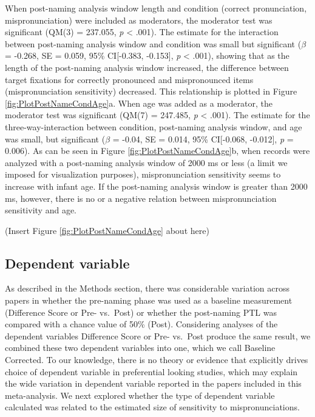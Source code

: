 \documentclass[
  man, noextraspace]{apa6}
\begin{document}
When post-naming analysis window length and condition (correct pronunciation, mispronunciation) were included as moderators, the moderator test was significant (QM(3) = 237.055, \emph{p} \textless{} .001). The estimate for the interaction between post-naming analysis window and condition was small but significant (\(\beta\) = -0.268, SE = 0.059, 95\% CI{[}-0.383, -0.153{]}, \emph{p} \textless{} .001), showing that as the length of the post-naming analysis window increased, the difference between target fixations for correctly pronounced and mispronounced items (mispronunciation sensitivity) decreased. This relationship is plotted in Figure \ref{fig:PlotPostNameCondAge}a. When age was added as a moderator, the moderator test was significant (QM(7) = 247.485, \emph{p} \textless{} .001). The estimate for the three-way-interaction between condition, post-naming analysis window, and age was small, but significant (\(\beta\) = -0.04, SE = 0.014, 95\% CI{[}-0.068, -0.012{]}, \emph{p} = 0.006). As can be seen in Figure \ref{fig:PlotPostNameCondAge}b, when records were analyzed with a post-naming analysis window of 2000 ms or less (a limit we imposed for visualization purposes), mispronunciation sensitivity seems to increase with infant age. If the post-naming analysis window is greater than 2000 ms, however, there is no or a negative relation between mispronunciation sensitivity and age.

(Insert Figure \ref{fig:PlotPostNameCondAge} about here)

\hypertarget{dependent-variable}{%
\subsection{Dependent variable}\label{dependent-variable}}

As described in the Methods section, there was considerable variation across papers in whether the pre-naming phase was used as a baseline measurement (Difference Score or Pre- vs.~Post) or whether the post-naming PTL was compared with a chance value of 50\% (Post). Considering analyses of the dependent variables Difference Score or Pre- vs.~Post produce the same result, we combined these two dependent variables into one, which we call Baseline Corrected. To our knowledge, there is no theory or evidence that explicitly drives choice of dependent variable in preferential looking studies, which may explain the wide variation in dependent variable reported in the papers included in this meta-analysis. We next explored whether the type of dependent variable calculated was related to the estimated size of sensitivity to mispronunciations.
\end{document}
